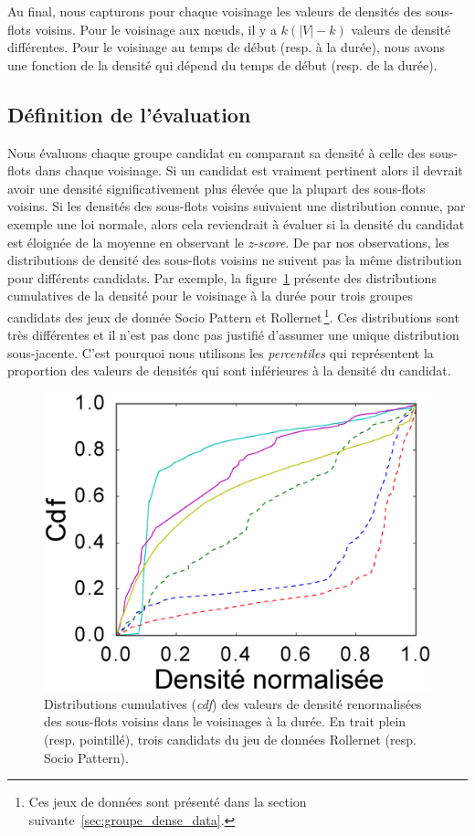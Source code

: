 Au final, nous capturons pour chaque voisinage les valeurs de densités des sous-flots voisins.
Pour le voisinage aux n\oe uds, il y a $k(|V|-k)$ valeurs de densité différentes.
Pour le voisinage au temps de début (resp. à la durée), nous avons une fonction de la densité qui dépend du temps de début (resp. de la durée).


\subsection{Définition de l'évaluation}
Nous évaluons chaque groupe candidat en comparant sa densité à celle des sous-flots dans chaque voisinage.
Si un candidat est vraiment pertinent alors il devrait avoir une densité significativement plus élevée que la plupart des sous-flots voisins.
Si les densités des sous-flots voisins suivaient une distribution connue, par exemple une loi normale, alors cela reviendrait à évaluer si la densité du candidat est éloignée de la moyenne en observant le \emph{z-score}.
De par nos observations, les distributions de densité des sous-flots voisins ne suivent pas la même distribution pour différents candidats.
Par exemple, la figure~\ref{fig:distrib_dens} présente des distributions cumulatives de la densité pour le voisinage à la durée pour trois groupes candidats des jeux de donnée Socio Pattern et Rollernet\,\footnote{Ces jeux de données sont présenté dans la section suivante~\ref{sec:groupe_dense_data}.}.
Ces distributions sont très différentes et il n'est pas donc pas justifié d'assumer une unique distribution sous-jacente.
C'est pourquoi nous utilisons les \emph{percentiles} qui représentent la proportion des valeurs de densités qui sont inférieures à la densité du candidat.


\begin{figure}
\centering
\includegraphics[width=0.3\linewidth]{img/GroupeDense/cdf_density_duration.eps}
\caption{Distributions cumulatives (\emph{cdf}) des valeurs de densité renormalisées des sous-flots voisins dans le voisinages à la durée.
En trait plein (resp. pointillé), trois candidats du jeu de données Rollernet (resp. Socio Pattern).}
\label{fig:distrib_dens}
\end{figure}


